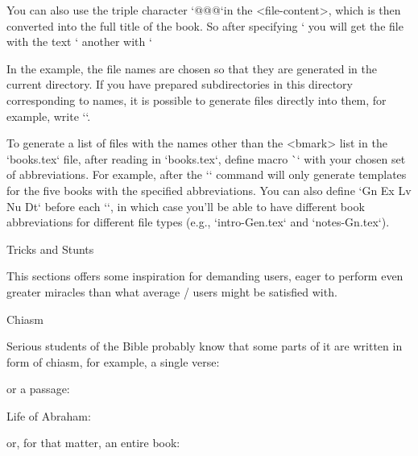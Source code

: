 {{{{You can also use the triple character `@@@`in the <file-content>, which is then converted into
the full title of the book. So after specifying 
`%
you will get the file with the text `%
another with `%

In the example, the file names are chosen so that they are generated in the current
directory. If you have prepared subdirectories in this directory corresponding to
names, it is possible to generate files directly into them, for example, write
``.

To generate a list of files with the names other than the <bmark> list  in the `books.tex` file, 
after reading in `books.tex`, define macro \`\genbooks` with your chosen set of abbreviations. 
For example, after
\begtt
\def\genbooks {Gn Ex Lv Nu Dt}
\endtt
%
the `\filegen` command will only generate templates for the five books with the specified
abbreviations. You can also define `\genbooks` before each `\filegen`, in which case
you'll be able to have different book abbreviations for different file types (e.g., `intro-Gen.tex` and `notes-Gn.tex`).

\sec[tricks] Tricks and Stunts  

This sections offers some inspiration for demanding users, eager to perform even greater miracles
than what average \OpBible/ users might be satisfied with.

\secc Chiasm

Serious students of the Bible probably know that some parts of it are written in form of chiasm, for example, a single verse:
\medskip
{}
\medskip

or a passage:

\medskip
Life of Abraham:

\medskip

or, for that matter, an entire book:

}}}}
